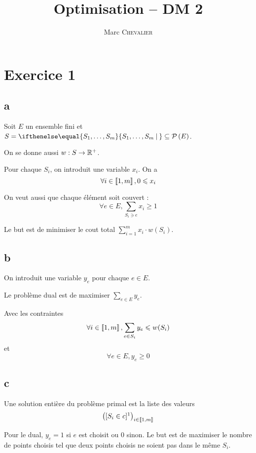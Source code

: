 

\title{Optimisation \--- DM 2}
\author{Marc \textsc{Chevalier}}
\date{}



\maketitle

\section*{Exercice 1}

\subsection*{a}

Soit $E$ un ensemble fini et $S=\set{S_1,\ldots,S_m}{}\subseteq \parties{E}$.

On se donne aussi $w:S\rightarrow \mathbb{R}^+$.

Pour chaque $S_i$, on introduit une variable $x_i$. On a 
\[
    \forall i \in \left\llbracket 1, m \right\rrbracket, 0\leqslant x_i
\]

On veut aussi que chaque élément soit couvert :
\[
    \forall e\in E, \sum\limits_{S_i \ni e} x_i \geqslant 1
\]

Le but est de minimiser le cout total $\sum\limits_{i=1}^m x_i \cdot w(S_i)$.

\subsection*{b}

On introduit une variable $y_e$ pour chaque $e\in E$.

Le problème dual est de maximiser $\sum\limits_{e \in E} y_e$.

Avec les contraintes
\[
    \forall i\in\left\llbracket 1, m \right\rrbracket, \sum\limits_{e\in S_i} y_e \leqslant w(S_i)
\]
et
\[
    \forall e\in E, y_e \geqslant 0
\]

\subsection*{c}

Une solution entière du problème primal est la liste des valeurs
\[
    \big([S_i\in c]\footnotemark\big)_{i\in\entiers{1}{m}}
\]

Pour le dual, $y_e=1$ si $e$ est choisit ou $0$ sinon. Le but est de maximiser le nombre de points choisis tel que deux points choisis ne soient pas dans le même $S_i$.

